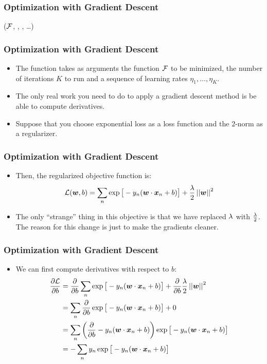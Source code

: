 \documentclass[trans]{beamer}
\begin{document}
\begin{frame}
  \frametitle{Optimization with Gradient Descent}
%
  {($\mathcal{F}$, , , \dots)}
  {
\SETST{$\vz\kth$}{$\VARm{\vz\kpth} - \VARm{\eta}\VARm{\kth} \VARm{\vg\kth}$}
\ENDFOR
\RETURN \VARm{$\vz\Kth$}
}
\end{frame}

\begin{frame}
  \frametitle{Optimization with Gradient Descent}
\begin{itemize}
\item
The function takes as arguments the
function $\mathcal{F}$ to be minimized, the number of iterations $K$ to run
and a sequence of learning rates $\eta_1, \dots, \eta_K$. 
\item
The only real work you need to do to apply a gradient descent method
is be able to compute derivatives. 
\item Suppose that you
choose exponential loss as a loss function and the $2$-norm as a
regularizer. 
\end{itemize}
\end{frame}

\begin{frame}
  \frametitle{Optimization with Gradient Descent}
\begin{itemize}
\item  Then, the regularized objective function is:
%
\begin{equation}
\mathcal{L}({\boldsymbol{w}},b) =
\sum_n 
  \exp\big[-y_n (\boldsymbol{w} \cdot {\boldsymbol{x}}_n+b)\big] +
 \frac {\lambda} 2 \left\vert\left\vert {\boldsymbol{w}} \right\vert\right\vert^2
\end{equation}
%
\item The only ``strange'' thing in this objective is that we have replaced
$\lambda$ with $\frac {\lambda} 2$.  The reason for this change is just to make
the gradients cleaner.  
\end{itemize}
\end{frame}

\begin{frame}
  \frametitle{Optimization with Gradient Descent}
\begin{itemize}
\item
We can first compute derivatives with respect
to $b$:
%
\begin{align}
\frac {\partial\mathcal{L}} {\partial b}
&= \frac \partial {\partial b}\sum_n \exp\big[-y_n (\boldsymbol{w} \cdot {\boldsymbol{x}}_n+b)\big] + \frac \partial {\partial b}\frac {\lambda} 2 \left\vert\left\vert {\boldsymbol{w}} \right\vert\right\vert^2\\
&= \sum_n \frac \partial {\partial b} \exp\big[ -y_n (\boldsymbol{w} \cdot {\boldsymbol{x}}_n+b)\big] + 0\\
&= \sum_n \left( \frac \partial {\partial b} -y_n (\boldsymbol{w} \cdot {\boldsymbol{x}}_n+b) \right) \exp\big[ -y_n (\boldsymbol{w} \cdot {\boldsymbol{x}}_n+b)\big]\\
&= - \sum_n y_n \exp\big[ -y_n (\boldsymbol{w} \cdot {\boldsymbol{x}}_n+b)\big]
\end{align}
%
\end{itemize}
\end{frame}
\end{document}
